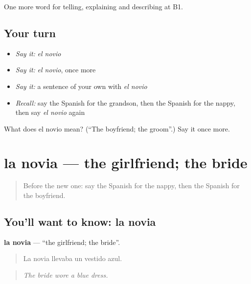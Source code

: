 \begin{grammarlens}[title={What you've built}]
One more word for telling, explaining and describing at B1.
\end{grammarlens}

\subsection*{Your turn}
\begin{itemize}
\raggedright
  \item \emph{Say it:} \emph{el novio}
  \item \emph{Say it:} \emph{el novio}, once more
  \item \emph{Say it:} a sentence of your own with \emph{el novio}
  \item \emph{Recall:} say the Spanish for the grandson, then the Spanish for the nappy, then say \emph{el novio} again
\end{itemize}

\begin{tcolorbox}[breakable,colback=teal!4,colframe=teal!35!black,title={Before you move on}]
What does el novio mean? (\textquotedblleft{}The boyfriend; the groom\textquotedblright{}.) Say it once more.
\end{tcolorbox}
\section[la novia]{la novia — the girlfriend; the bride}

\label{lesson:ES-C547-novia}



\begin{quote}
Before the new one: say the Spanish for the nappy, then the Spanish for the boyfriend.
\end{quote}

\subsection*{You'll want to know: la novia}
\textbf{la novia} — \textquotedblleft{}the girlfriend; the bride\textquotedblright{}.

\begin{quote}
La novia llevaba un vestido azul.
\end{quote}

\begin{quote}
\emph{The bride wore a blue dress.}
\end{quote}

